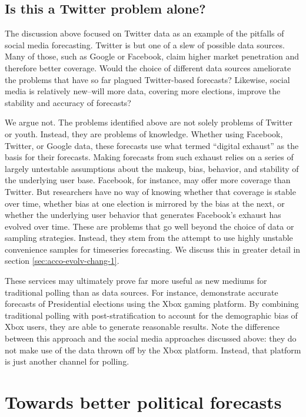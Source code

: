 \documentclass{article}
\begin{document}
\subsection{Is this a Twitter problem alone?}
\label{sec:this-twitter-problem}

The discussion above focused on Twitter data as an example of the
pitfalls of social media forecasting. Twitter is but one of a slew of
possible data sources. Many of those, such as Google or Facebook,
claim higher market penetration and therefore better coverage. Would
the choice of different data sources ameliorate the problems that have
so far plagued Twitter-based forecasts? Likewise, social media is
relatively new--will more data, covering more elections, improve the
stability and accuracy of forecasts?

We argue not. The problems identified above are not solely problems of
Twitter or youth. Instead, they are problems of knowledge. Whether
using Facebook, Twitter, or Google data, these forecasts use what
\cite{mckinsey2011} termed ``digital exhaust'' as the basis for their
forecasts. Making forecasts from such exhaust relies on a series of
largely untestable assumptions about the makeup, bias, behavior, and
stability of the underlying user base. Facebook, for instance, may
offer more coverage than Twitter. But researchers have no way of
knowing whether that coverage is stable over time, whether bias at one
election is mirrored by the bias at the next, or whether the
underlying user behavior that generates Facebook's exhaust has evolved
over time. These are problems that go well beyond the choice of data
or sampling strategies. Instead, they stem from the attempt to use
highly unstable convenience samples for timeseries forecasting. We
discuss this in greater detail in section
\ref{sec:acco-evolv-chang-1}.

These services may ultimately prove far more useful as new
mediums for traditional polling than as data sources. For
instance, \cite{wanga2013forecasting} demonstrate accurate forecasts
of Presidential elections using the Xbox gaming platform. By combining
traditional polling with post-stratification to account for the
demographic bias of Xbox users, they are able to generate reasonable
results. Note the difference between this approach and the social
media approaches discussed above: they do not make use of the data
thrown off by the Xbox platform. Instead, that platform is just
another channel for polling. 

\section{Towards better political forecasts}
\label{sec:towards-bett-polit}
\end{document}
